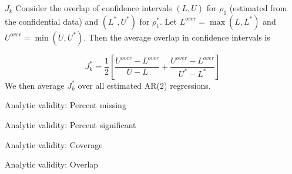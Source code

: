 \begin{frame}{$J_k$}
Consider the overlap of confidence intervals $(L,U)$ for $\rho_1$ (estimated from the 
confidential data) and $(L^{*},U^{*})$ for $\rho_1^*$. Let $L^{over} = \max (L,L^{*} )$ and 
$U^{over} = \min (U,U^{*})$. Then the average overlap in confidence intervals is

$$
J_k^{*} = \frac{1}{2} \left [ \frac{U^{over} - L^{over}}{U-L} + \frac{U^{over} - L^{over}}{U^*-L ^*}        \right ]
$$
We then average $J_k^{*}$ over all estimated AR(2) regressions.
\end{frame}

%
%
%


\begin{frame}[fragile]{Analytic validity: Percent missing}
	\begin{center}
		\footnotesize
		
		
		
	\end{center}
\end{frame}




\begin{frame}[fragile]{Analytic validity: Percent significant}
	\begin{center}
		\footnotesize
		
		
		
	\end{center}
\end{frame}


\begin{frame}[fragile]{Analytic validity: Coverage}
	\begin{center}
		\footnotesize
		
		
		
	\end{center}
\end{frame}

\begin{frame}[fragile]{Analytic validity: Overlap}
	\begin{center}
		\footnotesize
		
		
		
	\end{center}
\end{frame}









